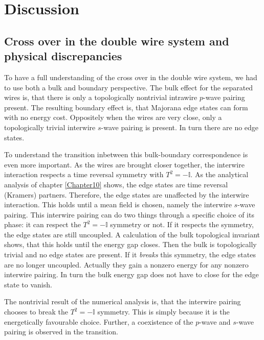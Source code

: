 \chapter{Discussion} 

\label{Chapter14} 

\section{Cross over in the double wire system and physical discrepancies} \label{sec.Discussion.2wires.crossover}
To have a full understanding of the cross over in the double wire system, we had to use both a bulk and boundary perspective. The bulk effect for the separated wires is, that there is only a topologically nontrivial intrawire $p$-wave pairing present. The resulting boundary effect is, that Majorana edge states can form with no energy cost. Oppositely when the wires are very close, only a topologically trivial interwire $s$-wave pairing is present. In turn there are no edge states. 

To understand the transition inbetween this bulk-boundary correspondence is even more important. As the wires are brought closer together, the interwire interaction respects a time reversal symmetry with $T^2 = - \mathbb{I}$. As the analytical analysis of chapter \ref{Chapter10} shows, the edge states are time reversal (Kramers) partners. Therefore, the edge states are unaffected by the interwire interaction. This holds until a mean field is chosen, namely the interwire $s$-wave pairing. This interwire pairing can do two things through a specific choice of its phase: it can respect the $T^2 = - \mathbb{I}$ symmetry or not. If it respects the symmetry, the edge states are still uncoupled. A calculation of the bulk topological invariant shows, that this holds until the energy gap closes. Then the bulk is topologically trivial and no edge states are present. If it \textit{breaks} this symmetry, the edge states are no longer uncoupled. Actually they gain a nonzero energy for any nonzero interwire pairing. In turn the bulk energy gap does not have to close for the edge state to vanish. 

The nontrivial result of the numerical analysis is, that the interwire pairing chooses to break the $T^2 = -\mathbb{I}$ symmetry. This is simply because it is the energetically favourable choice. Further, a coexistence of the $p$-wave and $s$-wave pairing is observed in the transition. 


